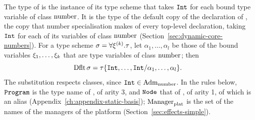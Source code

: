 The type of  is the instance of its type scheme that takes $\mathtt{Int}$
for each bound type variable of class $\mathrm{number}$. It is the type of the default
copy of the declaration of , the copy that number specialisation
makes of every top-level declaration, taking $\mathtt{Int}$ for each of its variables
of class $\mathrm{number}$ (Section~\ref{sec:dynamic-core-numbers}). %
For a type scheme $\sigma=\forall\xi^{(k)}.\tau$, let
$\alpha_1,\ldots,\alpha_l$ be those of the bound variables
$\xi_1,\ldots,\xi_k$ that are type variables of class $\mathrm{number}$; then
\[
  \mathrm{Dflt}\,\sigma=\tau\{\mathtt{Int},\ldots,\mathtt{Int}/\alpha_1,\ldots,\alpha_l\} .
\]
The substitution respects classes, since $\mathtt{Int}\in\mathrm{Adm}_{\mathrm{number}}$. In the rules
below, $\mathtt{Program}$ is the type name of , of arity 3,
and $\mathtt{Node}$ that of , of arity 1, of which  is
an alias (Appendix~\ref{ch:appendix-static-basis}); $\mathrm{Manager}_{\mathrm{plat}}$ is the set
of the names of the managers of the platform
(Section~\ref{sec:effects-simple}).


  {\jstat{\pgBstat}{\modm\ \program}{(\tau,\PE)}}

  {}

  {}

